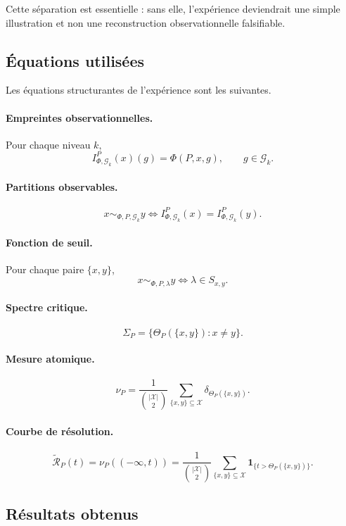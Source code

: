 \documentclass[11pt,a4paper,openany]{book}
\begin{document}
Cette séparation est essentielle : sans elle, l'expérience deviendrait une simple illustration et non une reconstruction observationnelle falsifiable.

\subsection{Équations utilisées}

Les équations structurantes de l'expérience sont les suivantes.

\paragraph{Empreintes observationnelles.}
Pour chaque niveau \(k\),
\[
I_{\Phi,\mathcal G_k}^P(x)(g)=\Phi(P,x,g),
\qquad g\in\mathcal G_k.
\]

\paragraph{Partitions observables.}
\[
x\sim_{\Phi,P,\mathcal G_k}y
\Longleftrightarrow
I_{\Phi,\mathcal G_k}^P(x)=I_{\Phi,\mathcal G_k}^P(y).
\]

\paragraph{Fonction de seuil.}
Pour chaque paire \(\{x,y\}\),
\[
x\sim_{\Phi,P,\lambda}y
\Longleftrightarrow
\lambda\in S_{x,y}.
\]

\paragraph{Spectre critique.}
\[
\Sigma_P=\{\Theta_P(\{x,y\}) : x\neq y\}.
\]

\paragraph{Mesure atomique.}
\[
\nu_P
=
\frac{1}{\binom{|\mathcal X|}{2}}
\sum_{\{x,y\}\subseteq\mathcal X}\delta_{\Theta_P(\{x,y\})}.
\]

\paragraph{Courbe de résolution.}
\[
\widetilde{\mathcal R}_P(t)
=
\nu_P((-\infty,t))
=
\frac{1}{\binom{|\mathcal X|}{2}}
\sum_{\{x,y\}\subseteq\mathcal X}
\mathbf 1_{\{t>\Theta_P(\{x,y\})\}}.
\]

\subsection{Résultats obtenus}
\end{document}
